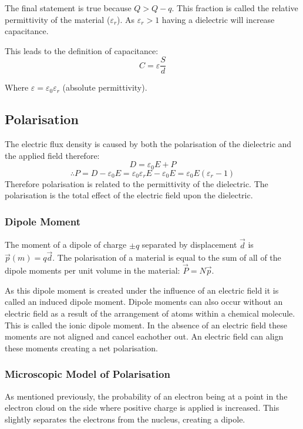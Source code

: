 \documentclass[11pt,a4paper]{report}
\begin{document}
The final statement is true because $Q > Q-q$. This fraction is called the relative permittivity of the material ($\varepsilon_r$). As $\varepsilon_r > 1$ having a dielectric will increase capacitance. 

This leads to the definition of capacitance:
\begin{equation*}
	C = \varepsilon \frac{S}{d}
\end{equation*}

Where $\varepsilon = \varepsilon_0\varepsilon_r$ (absolute permittivity).

\subsection{Polarisation}
The electric flux density is caused by both the polarisation of the dielectric and the applied field therefore:
\begin{equation*}
	D = \varepsilon_0E + P
\end{equation*}
\begin{equation*}
	\therefore P = D-\varepsilon_0E = \varepsilon_0\varepsilon_rE - \varepsilon_0E = \varepsilon_0E(\varepsilon_r-1)
\end{equation*}
Therefore polarisation is related to the permittivity of the dielectric. The polarisation is the total effect of the electric field upon the dielectric. 

\subsubsection{Dipole Moment}
The moment of a dipole of charge $\pm q$ separated by displacement $\vec{d}$ is $\vec{p}(m) = q\vec{d}$. The polarisation of a material is equal to the sum of all of the dipole moments per unit volume in the material: $\vec{P} = N\vec{p}$.

As this dipole moment is created under the influence of an electric field it is called an induced dipole moment. Dipole moments can also occur without an electric field as a result of the arrangement of atoms within a chemical molecule. This is called the ionic dipole moment. In the absence of an electric field these moments are not aligned and cancel eachother out. An electric field can align these moments creating a net polarisation.

\subsubsection{Microscopic Model of Polarisation}
As mentioned previously, the probability of an electron being at a point in the electron cloud on the side where positive charge is applied is increased. This slightly separates the electrons from the nucleus, creating a dipole.
\end{document}
